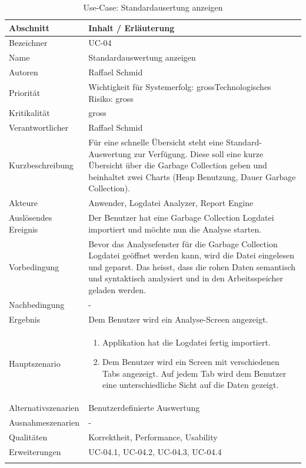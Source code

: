 \begin{longtable}{|p{4cm}|p{10.5cm}|}
\hline
   \textbf{Abschnitt} & \textbf{Inhalt / Erläuterung} \\\hline
   Bezeichner & UC-04\\\hline
   Name & Standardauswertung anzeigen\\\hline
   Autoren & Raffael Schmid\\\hline
   Priorität & Wichtigkeit für Systemerfolg: gross\newline Technologisches Risiko: gross\\\hline
   Kritikalität & gross\\\hline
   Verantwortlicher & Raffael Schmid\\\hline
   Kurzbeschreibung & Für eine schnelle Übersicht steht eine Standard-Auswertung zur Verfügung. Diese soll eine kurze Übersicht über die Garbage Collection geben und beinhaltet zwei Charts (Heap Benutzung, Dauer Garbage Collection). \\\hline
   Akteure & Anwender, Logdatei Analyzer, Report Engine\\\hline
   Auslösendes Ereignis & Der Benutzer hat eine Garbage Collection Logdatei importiert und möchte nun die Analyse starten.\\\hline
   Vorbedingung & Bevor das Analysefenster für die Garbage Collection Logdatei geöffnet werden kann, wird die Datei eingelesen und geparst. Das heisst, dass die rohen Daten semantisch und syntaktisch analysiert und in den Arbeitsspeicher geladen werden.\\\hline
   Nachbedingung & -\\\hline
   Ergebnis & Dem Benutzer wird ein Analyse-Screen angezeigt.\\\hline
   Hauptszenario & 
	\begin{enumerate}
		\item Applikation hat die Logdatei fertig importiert.
		\item Dem Benutzer wird ein Screen mit verschiedenen Tabs angezeigt. Auf jedem Tab wird dem Benutzer eine unterschiedliche Sicht auf die Daten gezeigt.
	\end{enumerate}
	\\\hline
   Alternativszenarien & Benutzerdefinierte Auswertung\\\hline
   Ausnahmeszenarien & -\\\hline
   Qualitäten &  Korrektheit, Performance, Usability\\\hline
   Erweiterungen & UC-04.1, UC-04.2, UC-04.3, UC-04.4 \\\hline
\caption{Use-Case: Standardausertung anzeigen}
\end{longtable}

